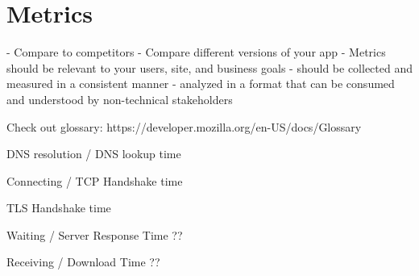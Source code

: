 \section{Metrics}
















- Compare to competitors
- Compare different versions of your app
- Metrics should be relevant to your users, site, and business goals
- should be collected and measured in a consistent manner
- analyzed in a format that can be consumed and understood by non-technical stakeholders





Check out glossary: https://developer.mozilla.org/en-US/docs/Glossary



DNS resolution / DNS lookup time %


Connecting / TCP Handshake time %


TLS Handshake time %


Waiting / Server Response Time ?? %


Receiving / Download Time ?? %




